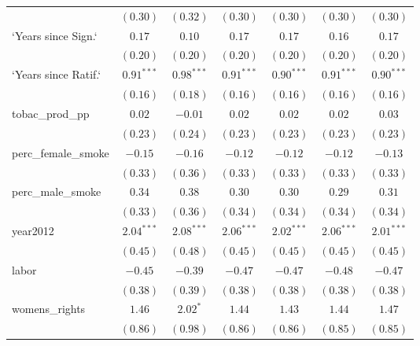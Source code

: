 \begin{table}[!h]
\begin{center}
\begin{tabular}{l c c c c c c }
                        & $(0.30)$     & $(0.32)$     & $(0.30)$     & $(0.30)$     & $(0.30)$     & $(0.30)$     \\
`Years since Sign.`     & $0.17$       & $0.10$       & $0.17$       & $0.17$       & $0.16$       & $0.17$       \\
                        & $(0.20)$     & $(0.20)$     & $(0.20)$     & $(0.20)$     & $(0.20)$     & $(0.20)$     \\
`Years since Ratif.`    & $0.91^{***}$ & $0.98^{***}$ & $0.91^{***}$ & $0.90^{***}$ & $0.91^{***}$ & $0.90^{***}$ \\
                        & $(0.16)$     & $(0.18)$     & $(0.16)$     & $(0.16)$     & $(0.16)$     & $(0.16)$     \\
tobac\_prod\_pp         & $0.02$       & $-0.01$      & $0.02$       & $0.02$       & $0.02$       & $0.03$       \\
                        & $(0.23)$     & $(0.24)$     & $(0.23)$     & $(0.23)$     & $(0.23)$     & $(0.23)$     \\
perc\_female\_smoke     & $-0.15$      & $-0.16$      & $-0.12$      & $-0.12$      & $-0.12$      & $-0.13$      \\
                        & $(0.33)$     & $(0.36)$     & $(0.33)$     & $(0.33)$     & $(0.33)$     & $(0.33)$     \\
perc\_male\_smoke       & $0.34$       & $0.38$       & $0.30$       & $0.30$       & $0.29$       & $0.31$       \\
                        & $(0.33)$     & $(0.36)$     & $(0.34)$     & $(0.34)$     & $(0.34)$     & $(0.34)$     \\
year2012                & $2.04^{***}$ & $2.08^{***}$ & $2.06^{***}$ & $2.02^{***}$ & $2.06^{***}$ & $2.01^{***}$ \\
                        & $(0.45)$     & $(0.48)$     & $(0.45)$     & $(0.45)$     & $(0.45)$     & $(0.45)$     \\
labor                   & $-0.45$      & $-0.39$      & $-0.47$      & $-0.47$      & $-0.48$      & $-0.47$      \\
                        & $(0.38)$     & $(0.39)$     & $(0.38)$     & $(0.38)$     & $(0.38)$     & $(0.38)$     \\
womens\_rights          & $1.46$       & $2.02^{*}$   & $1.44$       & $1.43$       & $1.44$       & $1.47$       \\
                        & $(0.86)$     & $(0.98)$     & $(0.86)$     & $(0.86)$     & $(0.85)$     & $(0.85)$     \\

\end{tabular}
\end{center}
\end{table}
